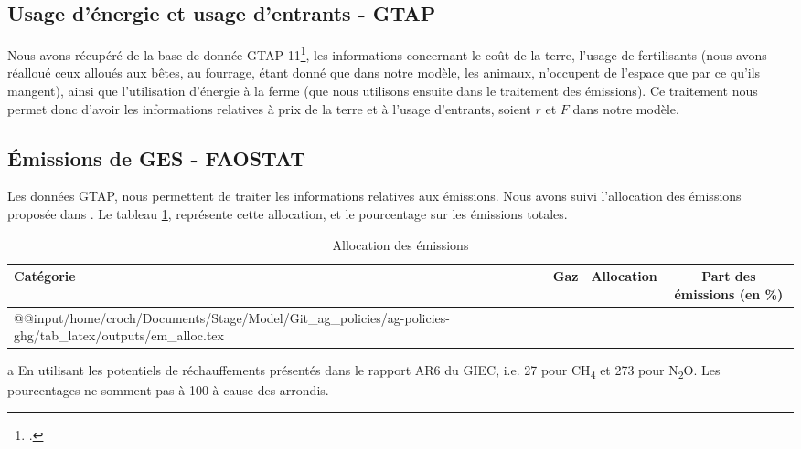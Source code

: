 \subsection{Usage d'énergie et usage d'entrants - GTAP}

Nous avons récupéré de la base de donnée GTAP 11\footcite{Aguiar2022}, les informations concernant le coût de la terre, l'usage de fertilisants (nous avons réalloué ceux alloués aux bêtes, au fourrage, étant donné que dans notre modèle, les animaux, n'occupent de l'espace que par ce qu'ils mangent), ainsi que l'utilisation d'énergie à la ferme (que nous utilisons ensuite dans le traitement des émissions). Ce traitement nous permet donc d'avoir les informations relatives à prix de la terre et à l'usage d'entrants, soient $r$ et $F$ dans notre modèle.


\subsection{Émissions de GES - FAOSTAT}

Les données GTAP, nous permettent de traiter les informations relatives aux émissions. Nous avons suivi l'allocation des émissions proposée dans \cite{Valin2023}. Le tableau \ref{tab:em_allocation}, représente cette allocation, et le pourcentage sur les émissions totales.

\begin{table}[h]
    \centering
    \begin{threeparttable}
        \begin{tabularx}{\textwidth}{p{1.5in}p{1.2in}p{1.2in}c}
            \textbf{Catégorie} & \textbf{Gaz} & \textbf{Allocation} & \textbf{Part des émissions}\tnote{a} (en \%) \\ \hline
            \csname @@input\endcsname /home/croch/Documents/Stage/Model/Git_ag_policies/ag-policies-ghg/tab_latex/outputs/em_alloc.tex
            \hline
        \end{tabularx}
        \begin{tablenotes}
            \footnotesize
            \item[a] En utilisant les potentiels de réchauffements présentés dans le rapport AR6 du GIEC, i.e. 27 pour CH\textsubscript{4} et 273 pour N\textsubscript{2}O. Les pourcentages ne somment pas à 100 à cause des arrondis.
        \end{tablenotes}
        \caption{Allocation des émissions}
        \label{tab:em_allocation}
    \end{threeparttable}
\end{table}

